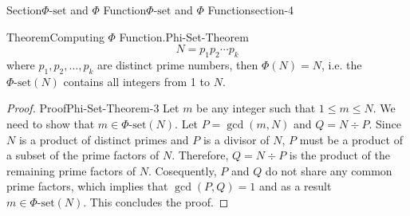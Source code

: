 \documentclass[oneside,12pt,]{article}
\numberwithin{equation}{section}
\begin{document}
\begin{sectionptx}{Section}{\(\Phi\text{-set}\) and \(\Phi\) Function}{}{\(\Phi\text{-set}\) and \(\Phi\) Function}{}{}{section-4}
\begin{theorem}{Theorem}{Computing \(\Phi\) Function.}{}{Phi-Set-Theorem}
\begin{equation*}
N = p_1 p_2 \cdots p_k
\end{equation*}
where \(p_1,p_2,\ldots,p_k\) are distinct prime numbers, then \(\Phi(N) = N\), i.e. the \(\Phi\text{-set}(N)\) contains all integers from 1 to \(N\).%
\end{theorem}
\begin{proof}{Proof}{}{Phi-Set-Theorem-3}
Let \(m\) be any integer such that \(1 \leq m \leq N\). We need to show that \(m \in \Phi\text{-set}(N)\). Let \(P = \gcd(m, N)\) and \(Q = N \div P\). Since \(N\) is a product of distinct primes and \(P\) is a divisor of \(N\), \(P\) must be a product of a subset of the prime factors of \(N\). Therefore, \(Q = N \div P\) is the product of the remaining prime factors of \(N\). Cosequently, \(P\) and \(Q\) do not share any common prime factors, which implies that \(\gcd(P, Q) = 1\) and as a result \(m \in \Phi\text{-set}(N)\). This concludes the proof.%
\end{proof}
\end{sectionptx}
%
%
\typeout{************************************************}
\typeout{************************************************}
%
\end{document}
